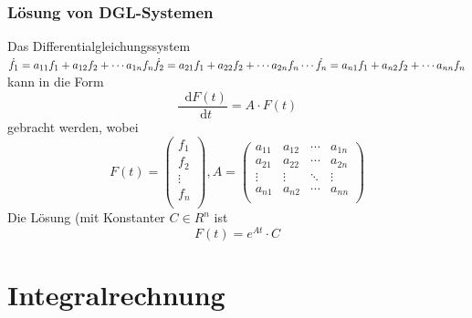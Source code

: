 \documentclass[8pt, a4paper, landscape, fleqn]{scrartcl}
\providecommand{\diff}{\mathop{} \! \mathrm{d}}
\begin{document}
\begin{multicols*}{3}
			\subsubsection{Lösung von DGL-Systemen}
			    Das Differentialgleichungssystem\\
        	        $\dot{f_1} = a_{11}f_1 + a_{12}f_2 + \cdots a_{1n}f_n\\
        		    \dot{f_2} = a_{21}f_1 + a_{22}f_2 + \cdots a_{2n}f_n\\
        		    \cdots\\
        		    \dot{f_n} = a_{n1}f_1 + a_{n2}f_2 + \cdots a_{nn}f_n$\\
        		kann in die Form
			    \begin{equation*}
			        \frac{\diff F(t)}{\diff t} = A \cdot F(t)
			    \end{equation*}
			    gebracht werden, wobei
			    \begin{equation*}
			        F(t)=
			        \begin{pmatrix}
		                f_1 \\
		                f_2 \\
		                \vdots \\
		                f_n \\
			        \end{pmatrix}, 
			        A = 
			        \begin{pmatrix}
		                a_{11} & a_{12} & \cdots & a_{1n} \\
		                a_{21} & a_{22} & \cdots & a_{2n}\\
		                \vdots & \vdots & \ddots & \vdots \\
		                a_{n1} & a_{n2} & \cdots & a_{nn} \\
		            \end{pmatrix}
			    \end{equation*}
			    Die Lösung (mit Konstanter $C \in R^n$ ist
			    \begin{equation*}
			        F(t) = e^{At} \cdot C
			    \end{equation*}
		\section{Integralrechnung}

\end{multicols*}
\end{document}
